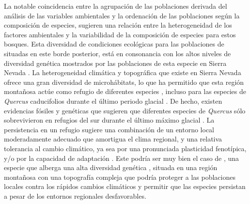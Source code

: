 La notable coincidencia entre la agrupación de las poblaciones derivada del análisis de las variables ambientales y la ordenación de las poblaciones según la composición de especies, sugieren una relación entre la heterogeneidad de los factores ambientales y la variabilidad de la composición de especies para estos bosques. Esta diversidad de condiciones ecológicas para las poblaciones de \Qp situadas en este borde posterior, está en consonancia con los altos niveles de diversidad genética mostrados por las poblaciones de esta especie en Sierra Nevada \autocites{ValbuenaCarabanaGil2013GeneticResilience, ValbuenaCarabanaGil2017CentenaryCoppicing}. La heterogeneidad climática y topográfica que existe en Sierra Nevada ofrece una gran diversidad de microhábitats, lo que ha permitido que esta región montañosa actúe como refugio de diferentes especies \autocites{MedailDiadema2009GlacialRefugia, GomezLunt2007RefugiaRefugia,BlancoPastoretal2019TopographyExplains}, incluso para las especies de \emph{Quercus} caducifolios durante el último periodo glacial \autocites{Breweretal2002SpreadDeciduous, Olaldeetal2002WhiteOaks,RodriguezSanchezetal2010TreeRange}. De hecho, existen evidencias fósiles y genéticas que sugieren que diferentes especies de \emph{Quercus} sólo sobrevivieron en refugios del sur durante el último máximo glacial \autocite{Breweretal2002SpreadDeciduous,Petitetal2002IdentificationRefugia,BhagwatWillis2008SpeciesPersistence,BirksWillis2008AlpinesTrees}. La persistencia en un refugio sugiere una combinación de un entorno local moderadamente adecuado que amortigua el clima regional, y una relativa tolerancia al cambio climático, ya sea por una pronunciada plasticidad fenotípica, y/o por la capacidad de adaptación \autocites{Gavinetal2014ClimateRefugia}. Este podría ser muy bien el caso de \Qp, una especie que alberga una alta diversidad genética \autocite{ValbuenaCarabanaGil2013GeneticResilience}, situada en una región montañosa con una topografía compleja que podría proteger a las poblaciones locales contra los rápidos cambios climáticos y permitir que las especies persistan a pesar de los entornos regionales desfavorables.

